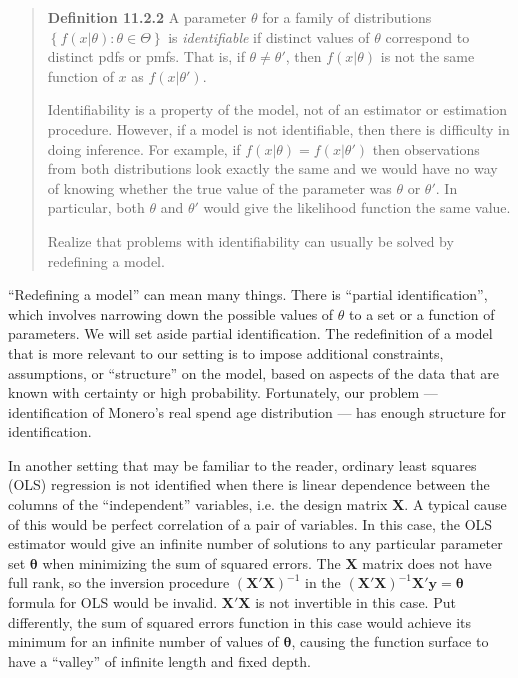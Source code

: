 \documentclass[english]{article}
\begin{document}
\begin{quote}
\textbf{Definition 11.2.2} A parameter $\theta$ for a family of distributions
$\left\{ f(x|\theta):\theta\in\Theta\right\} $ is \textit{identifiable}
if distinct values of $\theta$ correspond to distinct pdfs or pmfs.
That is, if $\theta\neq\theta'$, then $f(x|\theta)$ is not the same
function of $x$ as $f(x|\theta').$

Identifiability is a property of the model, not of an estimator or
estimation procedure. However, if a model is not identifiable, then
there is difficulty in doing inference. For example, if $f(x|\theta)=f(x|\theta')$
then observations from both distributions look exactly the same and
we would have no way of knowing whether the true value of the parameter
was $\theta$ or $\theta'$. In particular, both $\theta$ and $\theta'$
would give the likelihood function the same value.

Realize that problems with identifiability can usually be solved by
redefining a model.
\end{quote}
``Redefining a model'' can mean many things. There is ``partial
identification'', which involves narrowing down the possible values
of $\theta$ to a set or a function of parameters. We will set aside
partial identification. The redefinition of a model that is more relevant
to our setting is to impose additional constraints, assumptions, or
``structure'' on the model, based on aspects of the data that are
known with certainty or high probability. Fortunately, our problem
--- identification of Monero's real spend age distribution --- has
enough structure for identification.

In another setting that may be familiar to the reader, ordinary least
squares (OLS) regression is not identified when there is linear dependence
between the columns of the ``independent'' variables, i.e. the design
matrix $\mathbf{X}$. A typical cause of this would be perfect correlation
of a pair of variables. In this case, the OLS estimator would give
an infinite number of solutions to any particular parameter set $\boldsymbol{\theta}$
when minimizing the sum of squared errors. The $\mathbf{X}$ matrix
does not have full rank, so the inversion procedure $\left(\mathbf{X}'\mathbf{X}\right)^{-1}$
in the $\left(\mathbf{X}'\mathbf{X}\right)^{-1}\mathbf{X}'\mathbf{y}=\boldsymbol{\theta}$
formula for OLS would be invalid. $\mathbf{X}'\mathbf{X}$ is not
invertible in this case. Put differently, the sum of squared errors
function in this case would achieve its minimum for an infinite number
of values of $\boldsymbol{\theta}$, causing the function surface
to have a ``valley'' of infinite length and fixed depth.
\end{document}
